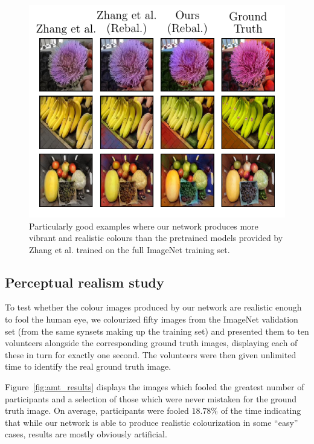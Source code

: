 \documentclass{article}
\begin{document}
\begin{figure}
    \centering
    \includegraphics{resources/good_vs_bad.pdf}
    \caption{Particularly good examples where our network produces more vibrant
             and realistic colours than the pretrained models provided by Zhang
             et al. trained on the full ImageNet training set.}
    \label{fig:good_vs_bad}
\end{figure}

\subsection{Perceptual realism study}

To test whether the colour images produced by our network are realistic enough
to fool the human eye, we colourized fifty images from the ImageNet validation
set (from the same synsets making up the training set) and presented them to
ten volunteers alongside the corresponding ground truth images, displaying each
of these in turn for exactly one second. The volunteers were then given
unlimited time to identify the real ground truth image.

Figure~\ref{fig:amt_results} displays the images which fooled the greatest
number of participants and a selection of those which were never mistaken for
the ground truth image. On average, participants were fooled $18.78\%$ of the
time indicating that while our network is able to produce realistic
colourization in some ``easy'' cases, results are mostly obviously artificial.
\end{document}
